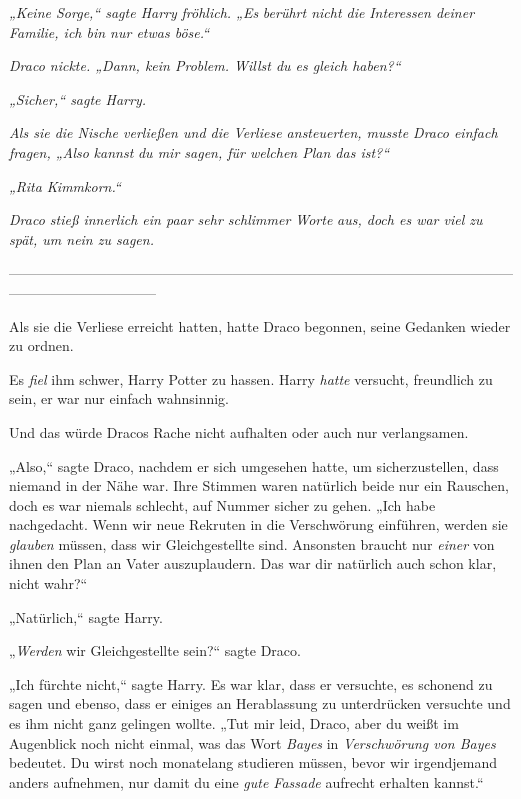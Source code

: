 {\emph{„Keine Sorge,“ sagte Harry} \emph{fröhlich. „Es} \emph{berührt nicht die} \emph{Interessen deiner Familie, ich bin nur etwas böse.“}

\emph{Draco nickte. „Dann, kein Problem. Willst du es gleich haben?“}

\emph{„Sicher,“ sagte Harry.}

\emph{Als sie die Nische verließen und die Verliese ansteuerten, musste Draco einfach fragen, „Also} \emph{\emph{kannst}} \emph{du mir sagen, für welchen Plan das ist?“}

\emph{„Rita Kimmkorn.“}

\emph{Draco stieß innerlich ein paar sehr schlimmer Worte} \emph{aus, doch es war viel zu spät, um nein zu sagen.}

--------------------------------------------------------------------------------------------------------------------------------------------

Als sie die Verliese erreicht hatten, hatte Draco begonnen, seine Gedanken wieder zu ordnen.

Es \emph{fiel} ihm schwer, Harry Potter zu hassen. Harry \emph{hatte} versucht, freundlich zu sein, er war nur einfach wahnsinnig.

Und das würde Dracos Rache nicht aufhalten oder auch nur verlangsamen.

„Also,“ sagte Draco, nachdem er sich umgesehen hatte, um sicherzustellen, dass niemand in der Nähe war. Ihre Stimmen waren natürlich beide nur ein Rauschen, doch es war niemals schlecht, auf Nummer sicher zu gehen. „Ich habe nachgedacht. Wenn wir neue Rekruten in die Verschwörung einführen, werden sie \emph{glauben} müssen, dass wir Gleichgestellte sind. Ansonsten braucht nur \emph{einer} von ihnen den Plan an Vater auszuplaudern. Das war dir natürlich auch schon klar, nicht wahr?“

„Natürlich,“ sagte Harry.

„\emph{Werden} wir Gleichgestellte sein?“ sagte Draco.

„Ich fürchte nicht,“ sagte Harry. Es war klar, dass er versuchte, es schonend zu sagen und ebenso, dass er einiges an Herablassung zu unterdrücken versuchte und es ihm nicht ganz gelingen wollte. „Tut mir leid, Draco, aber du weißt im Augenblick noch nicht einmal, was das Wort \emph{Bayes} in \emph{Verschwörung von Bayes} bedeutet. Du wirst noch monatelang studieren müssen, bevor wir irgendjemand anders aufnehmen, nur damit du eine \emph{gute Fassade} aufrecht erhalten kannst.“

}
